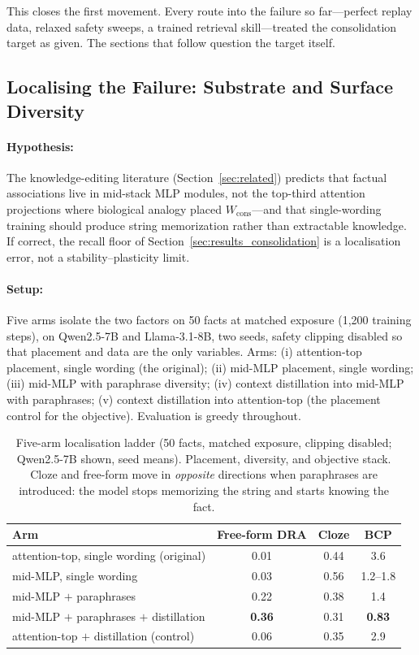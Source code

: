 This closes the first movement. Every route into the failure so far---perfect replay data, relaxed safety sweeps, a trained retrieval skill---treated the consolidation target as given. The sections that follow question the target itself.

\subsection{Localising the Failure: Substrate and Surface Diversity}
\label{sec:results_localisation}

\paragraph{Hypothesis:} The knowledge-editing literature (Section~\ref{sec:related}) predicts that factual associations live in mid-stack MLP modules, not the top-third attention projections where biological analogy placed $W_{\mathrm{cons}}$---and that single-wording training should produce string memorization rather than extractable knowledge. If correct, the recall floor of Section~\ref{sec:results_consolidation} is a localisation error, not a stability--plasticity limit.

\paragraph{Setup:} Five arms isolate the two factors on 50 facts at matched exposure (1{,}200 training steps), on Qwen2.5-7B and Llama-3.1-8B, two seeds, safety clipping disabled so that placement and data are the only variables. Arms: (i) attention-top placement, single wording (the original); (ii) mid-MLP placement, single wording; (iii) mid-MLP with paraphrase diversity; (iv) context distillation into mid-MLP with paraphrases; (v) context distillation into attention-top (the placement control for the objective). Evaluation is greedy throughout.

\begin{table}[t]
\centering
\caption{Five-arm localisation ladder (50 facts, matched exposure, clipping disabled; Qwen2.5-7B shown, seed means). Placement, diversity, and objective stack. Cloze and free-form move in \emph{opposite} directions when paraphrases are introduced: the model stops memorizing the string and starts knowing the fact.}
\label{tab:ladder}
\begin{tabular}{lccc}
\toprule
Arm & Free-form DRA & Cloze & BCP \\
\midrule
attention-top, single wording (original) & 0.01 & 0.44 & 3.6 \\
mid-MLP, single wording                  & 0.03 & 0.56 & 1.2--1.8 \\
mid-MLP $+$ paraphrases                  & 0.22 & 0.38 & 1.4 \\
mid-MLP $+$ paraphrases $+$ distillation & \textbf{0.36} & 0.31 & \textbf{0.83} \\
attention-top $+$ distillation (control) & 0.06 & 0.35 & 2.9 \\
\bottomrule
\end{tabular}
\end{table}

